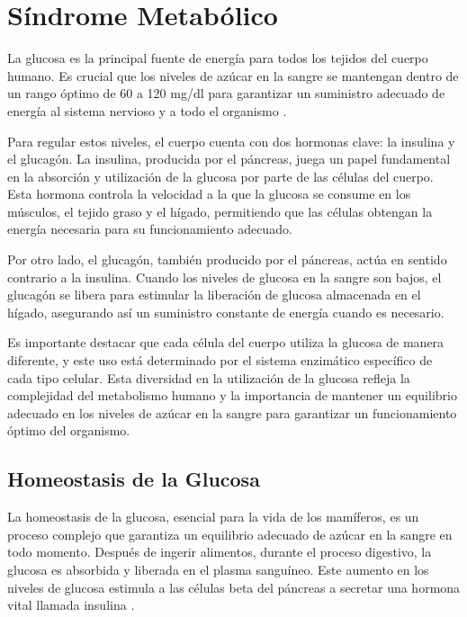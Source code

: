 \chapter{Síndrome Metabólico}\label{insulina}

La glucosa es la principal fuente de energía para todos los tejidos del cuerpo humano. Es crucial que los niveles de azúcar en la sangre se mantengan dentro de un rango óptimo de 60 a 120 mg/dl para garantizar un suministro adecuado de energía al sistema nervioso y a todo el organismo \cite{ImgHomeos}.

Para regular estos niveles, el cuerpo cuenta con dos hormonas clave: la insulina y el glucagón. La insulina, producida por el páncreas, juega un papel fundamental en la absorción y utilización de la glucosa por parte de las células del cuerpo. Esta hormona controla la velocidad a la que la glucosa se consume en los músculos, el tejido graso y el hígado, permitiendo que las células obtengan la energía necesaria para su funcionamiento adecuado.

Por otro lado, el glucagón, también producido por el páncreas, actúa en sentido contrario a la insulina. Cuando los niveles de glucosa en la sangre son bajos, el glucagón se libera para estimular la liberación de glucosa almacenada en el hígado, asegurando así un suministro constante de energía cuando es necesario.

Es importante destacar que cada célula del cuerpo utiliza la glucosa de manera diferente, y este uso está determinado por el sistema enzimático específico de cada tipo celular. Esta diversidad en la utilización de la glucosa refleja la complejidad del metabolismo humano y la importancia de mantener un equilibrio adecuado en los niveles de azúcar en la sangre para garantizar un funcionamiento óptimo del organismo.\cite{capitulo4Metabolic}

\section{Homeostasis de la Glucosa}

La homeostasis de la glucosa, esencial para la vida de los mamíferos, es un proceso complejo que garantiza un equilibrio adecuado de azúcar en la sangre en todo momento. Después de ingerir alimentos, durante el proceso digestivo, la glucosa es absorbida y liberada en el plasma sanguíneo. Este aumento en los niveles de glucosa estimula a las células beta del páncreas a secretar una hormona vital llamada insulina \cite{capitulo4Metabolic}.

